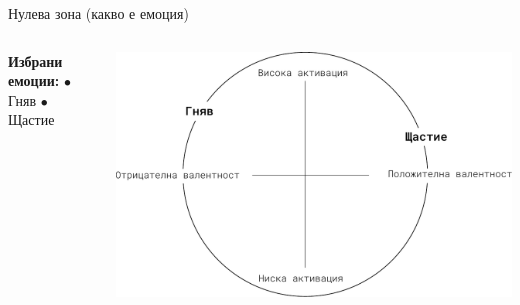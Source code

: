 \documentclass[9pt]{beamer}
\begin{document}
    \begin{frame}{Нулева зона (какво е емоция)}
        \begin{columns}[T] %
            \begin{column}{.38\textwidth}
                \textbf{Избрани емоции:}
                \vspace{1cm} \leavevmode \newline
                $\bullet\ $ Гняв
                \vspace{1cm} \leavevmode \newline
                $\bullet\ $ Щастие
                \vspace{1cm} \leavevmode \newline
                \phantom{$\bullet\ $ Неутрална емоция}
                \vspace{1cm} \leavevmode \newline
                \phantom{$\bullet\ $ Тъга}
            \end{column}%
            \hfill%
            \begin{column}{.60\textwidth}
                \vspace{1cm}
                \begin{center}
                    \includegraphics[width=\textwidth]{valence_arousal_ah}%
                \end{center}
            \end{column}%
        \end{columns}
    \end{frame}
\end{document}
